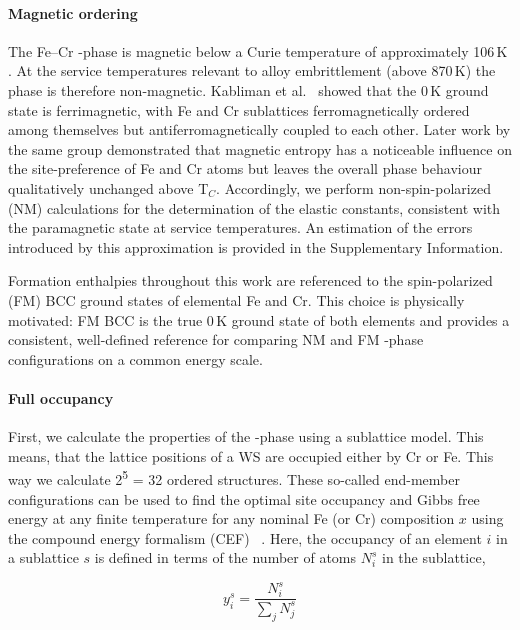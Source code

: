 \documentclass[superscriptaddress, 12pt]{revtex4-2}%
\begin{document}
\paragraph{Magnetic ordering}
The Fe–Cr \textsigma-phase is magnetic below a Curie temperature of approximately 106\,K \cite{nevitt1955curie}.
At the service temperatures relevant to alloy embrittlement (above 870\,K) the phase is therefore non-magnetic.
Kabliman et al.\ \cite{kabliman2009first} showed that the 0\,K ground state is ferrimagnetic, with Fe and Cr sublattices ferromagnetically ordered among themselves but antiferromagnetically coupled to each other.
Later work by the same group \cite{KablimanConfigurationalThermoSigma} demonstrated that magnetic entropy has a noticeable influence on the site-preference of Fe and Cr atoms but leaves the overall phase behaviour qualitatively unchanged above T$_C$.
Accordingly, we perform non-spin-polarized (NM) calculations for the determination of the elastic constants, consistent with the paramagnetic state at service temperatures.
An estimation of the errors introduced by this approximation is provided in the Supplementary Information.

Formation enthalpies throughout this work are referenced to the spin-polarized (FM) BCC ground states of elemental Fe and Cr.
This choice is physically motivated: FM BCC is the true 0\,K ground state of both elements and provides a consistent, well-defined reference for comparing NM and FM \textsigma-phase configurations on a common energy scale.

\paragraph{Full occupancy}\label{methodology:fo} First, we calculate the properties of the \textsigma-phase using a sublattice model.
This means, that the lattice positions of a WS are occupied either by Cr or Fe.
This way we calculate  2\textsuperscript{5} = 32 ordered structures. 
These so-called end-member configurations can be used to find the optimal site occupancy and Gibbs free energy at any finite temperature for any nominal Fe (or Cr) composition $x$ using the compound energy formalism (CEF) ~\cite{dupin_using_2006, crivello_first_2009, zhang_prediction_2025}.
Here, the occupancy of an element $i$ in a sublattice $s$ is defined in terms of the number of atoms $N_i ^s$ in the sublattice,

\begin{equation}\label{eqn:occupancy}
  y_i ^s = \dfrac{N_i ^s}{\sum _j N_j ^s}
\end{equation}
\end{document}
